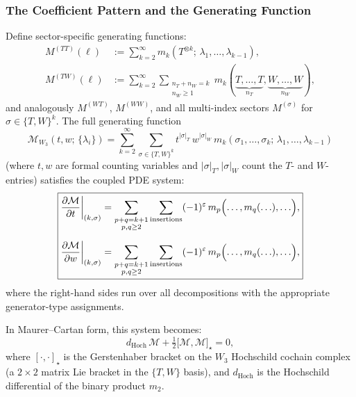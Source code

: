 \subsubsection{The Coefficient Pattern and the Generating Function}

\begin{theorem}
\label{thm:w3-gen-func-coupled}
Define sector-specific generating functions:
\begin{align}
\label{eq:w3-M-TT}
M^{(TT)}(\ell) &:= \sum_{k=2}^\infty m_k(T^{\otimes k};\, \lambda_1, \ldots, \lambda_{k-1}),\\
\label{eq:w3-M-TW}
M^{(TW)}(\ell) &:= \sum_{k=2}^\infty
 \sum_{\substack{n_T + n_W = k \\ n_W \ge 1}}
 m_k(\underbrace{T, \ldots, T}_{n_T}, \underbrace{W, \ldots, W}_{n_W}),
\end{align}
and analogously $M^{(WT)}$, $M^{(WW)}$, and all multi-index sectors
$M^{(\sigma)}$ for $\sigma \in \{T,W\}^k$. The full generating function
\begin{equation}
\label{eq:w3-gen-func-full}
\mathcal{M}_{W_3}(t, w;\, \{\lambda_i\})
= \sum_{k=2}^\infty \sum_{\sigma \in \{T,W\}^k}
 t^{|\sigma|_T}\, w^{|\sigma|_W}\,
 m_k(\sigma_1, \ldots, \sigma_k;\, \lambda_1, \ldots, \lambda_{k-1})
\end{equation}
(where $t, w$ are formal counting variables and
$|\sigma|_T, |\sigma|_W$ count the $T$- and $W$-entries)
satisfies the coupled PDE system:
\begin{equation}
\label{eq:w3-master-pde}
\boxed{
\begin{aligned}
\frac{\partial \mathcal{M}}{\partial t}\bigg|_{(k,\sigma)}
&= \sum_{\substack{p+q = k+1 \\ p,q \ge 2}}
 \sum_{\text{insertions}} (-1)^{\varepsilon}\,
 m_p\Bigl(\ldots, m_q(\ldots), \ldots\Bigr),\\[6pt]
\frac{\partial \mathcal{M}}{\partial w}\bigg|_{(k,\sigma)}
&= \sum_{\substack{p+q = k+1 \\ p,q \ge 2}}
 \sum_{\text{insertions}} (-1)^{\varepsilon}\,
 m_p\Bigl(\ldots, m_q(\ldots), \ldots\Bigr),
\end{aligned}
}
\end{equation}
where the right-hand sides run over all decompositions with the
appropriate generator-type assignments.

In Maurer--Cartan form, this system becomes:
\begin{equation}
\label{eq:w3-MC-system}
d_{\mathrm{Hoch}}\, \mathcal{M} + \tfrac{1}{2}\bigl[\mathcal{M}, \mathcal{M}\bigr]_\star = 0,
\end{equation}
where $[\cdot, \cdot]_\star$ is the Gerstenhaber bracket on the
$W_3$ Hochschild cochain complex (a $2 \times 2$ matrix Lie bracket in the
$\{T,W\}$ basis), and $d_{\mathrm{Hoch}}$ is the Hochschild differential
of the binary product $m_2$.
\end{theorem}

